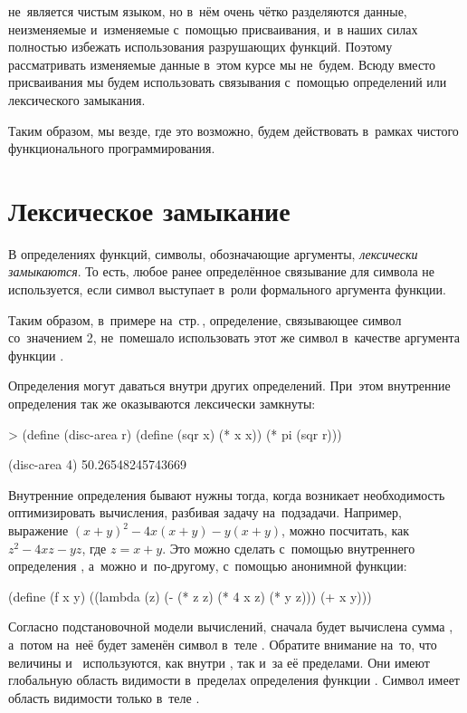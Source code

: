 \Scheme не~является чистым языком, но в~нём очень чётко разделяются данные, неизменяемые и~изменяемые с~помощью присваивания, и~в наших силах полностью избежать использования разрушающих функций. Поэтому рассматривать изменяемые данные в~этом курсе мы не~будем. Всюду вместо присваивания мы будем использовать связывания с~помощью определений или лексического замыкания.

Таким образом, мы везде, где это возможно, будем действовать в~рамках чистого функционального программирования.

\section{Лексическое замыкание}%
В определениях функций, символы, обозначающие аргументы, \emph{лексически замыкаются}. То есть, любое ранее определённое связывание для символа не используется, если символ выступает в~роли формального аргумента функции.

Таким образом, в~примере на~стр.\,\pageref{define}, определение, связывающее символ  со~значением 2, не~помешало использовать этот же символ в~качестве аргумента функции .

Определения могут даваться внутри других определений. При~этом внутренние определения так же оказываются лексически замкнуты:

\begin{SchemeCode}[emph={x,r}]
   > (define (disc-area r)
       (define (sqr x) (* x x))
       (* pi (sqr r)))
\end{SchemeCode}
\REPL
  {(disc-area 4)}
  {50.26548245743669}

Внутренние определения бывают нужны тогда, когда возникает необходимость оптимизировать вычисления, разбивая задачу на~подзадачи. Например, выражение $(x + y)^2- 4x(x + y)-y(x + y)$, можно посчитать, как $z^2-4xz-yz$, где $z = x + y$. Это можно сделать с~помощью внутреннего определения , а~можно и~по-другому, с~помощью анонимной функции:

\begin{Definition}[emph={x,y,z}]
(define (f x y)
  ((lambda (z) (- (* z z) (* 4 x z) (* y z)))
   (+ x y)))
\end{Definition}

Согласно подстановочной модели вычислений, сначала будет вычислена сумма , а~потом на~неё будет заменён символ  в~теле . Обратите внимание на~то, что величины  и~ используются, как внутри , так и~за её пределами. Они имеют глобальную область видимости в~пределах определения функции . Символ  имеет область видимости только в~теле .

